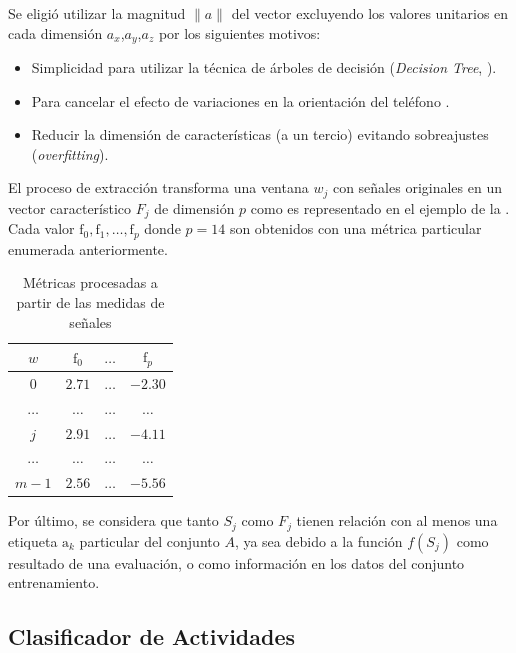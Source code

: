 Se eligió utilizar la magnitud $\lVert a\rVert$ del vector excluyendo
los valores unitarios en cada dimensión $a_{x}$,$a_{y}$,$a_{z}$
por los siguientes motivos:
\begin{itemize}
\item Simplicidad para utilizar la técnica de árboles de decisión (\emph{Decision
Tree}, ).
\item Para cancelar el efecto de variaciones en la orientación del teléfono
\cite{Schneider2014}.
\item Reducir la dimensión de características (a un tercio) evitando sobreajustes
(\emph{overfitting}).
\end{itemize}
El proceso de extracción transforma una ventana $w_{j}$ con señales
originales en un vector característico $F_{j}$ de dimensión $p$
como es representado en el ejemplo de la .
Cada valor $\mathrm{f}_{0},\mathrm{f}_{1},\ldots,\mathrm{f}_{p}$
donde $p=14$ son obtenidos con una métrica particular enumerada anteriormente.

\begin{table}[!tbph]
\begin{centering}
\begin{tabular}{|c|c|c|c|}
\hline 
$w$ & $\mathrm{f}_{0}$ & $\ldots$ & $\mathrm{f}_{p}$\tabularnewline
\hline 
\hline 
$0$ & $2.71$ & \texttt{$\ldots$} & \texttt{$-2.30$}\tabularnewline
\hline 
$\ldots$ & $\ldots$ & \texttt{$\ldots$} & \texttt{$\ldots$}\tabularnewline
\hline 
$j$ & $2.91$ & \texttt{$\ldots$} & \texttt{$-4.11$}\tabularnewline
\hline 
$\ldots$ & $\ldots$ & \texttt{$\ldots$} & \texttt{$\ldots$}\tabularnewline
\hline 
$m-1$ & $2.56$ & \texttt{$\ldots$} & \texttt{$-5.56$}\tabularnewline
\hline 
\end{tabular}
\par\end{centering}
\caption[Métricas de proceso de extracción]{\label{tab4:features}Métricas procesadas a partir de las medidas
de señales}
\end{table}

Por último, se considera que tanto $S_{j}$ como $F_{j}$ tienen relación
con al menos una etiqueta $\mathrm{a}_{k}$ particular del conjunto
$A$, ya sea debido a la función $f(S_{j})$ como resultado de una
evaluación, o como información en los datos del conjunto entrenamiento.

\subsection{Clasificador de Actividades }

